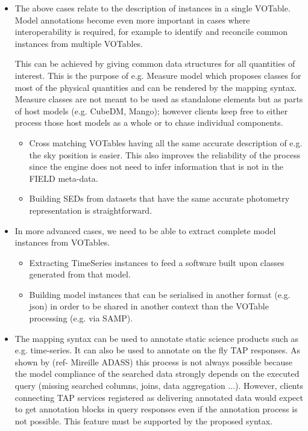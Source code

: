 \begin{itemize}
  \item The above cases relate to the description of instances in a
  single VOTable. Model annotations become even more important in cases
  where interoperability is required, for example to identify and
  reconcile common instances from multiple VOTables.

  This can be achieved by giving  common data structures for all 
  quantities of interest. This is the purpose of e.g. Measure model 
  which proposes classes for most of the physical quantities and can 
  be rendered by the mapping syntax. Measure classes are not meant to 
  be used as standalone elements but as parts of host models 
  (e.g. CubeDM, Mango);
  however clients keep free to either process those host models as a
  whole or to chase individual components.
    \begin{itemize}
      \item Cross matching VOTables having all the same accurate description of e.g. the sky position is easier. %
               This also improves the reliability of the process since the engine does not need to infer information that is not in the FIELD meta-data.
      \item Building SEDs from datasets that have the same accurate photometry representation is straightforward.
   \end{itemize}          

  \item In more advanced cases, we need to be able to extract complete model instances from VOTables.
    \begin{itemize}
      \item Extracting  TimeSeries instances to feed a software built upon classes generated from that model.
      \item Building model instances that can be serialised in another format (e.g. json) in order to be shared in another context than the VOTable processing (e.g. via SAMP).
   \end{itemize}         
    
   \item The mapping syntax can be used to annotate static science products such as e.g. time-series. It can also be used to annotate on the fly TAP responses.
   As shown by (ref- Mireille ADASS) this process is not always possible because the model compliance of the searched data strongly depends on the executed query (missing searched columns, joins, data aggregation ...). 
   However, clients connecting TAP services registered as delivering annotated data would expect to get annotation blocks in query responses even if the annotation process is not possible. 
   This feature must be supported by the proposed syntax.
    
\end{itemize} 

